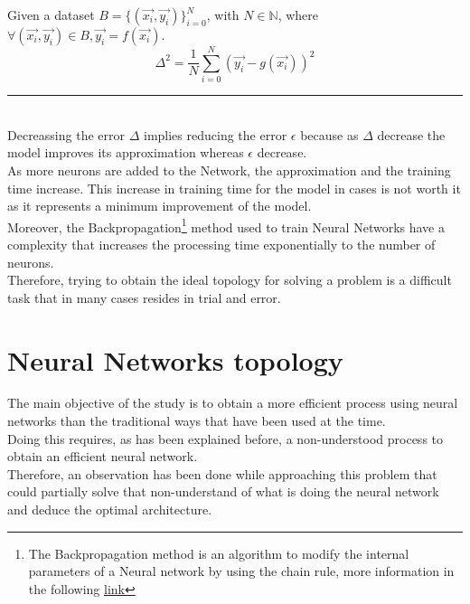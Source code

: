 \documentclass[a4paper, 11pt]{article}
\begin{document}
Given a dataset $B = \{(\vec{x_i},\vec{y_i})\}_{i=0}^{N}$, with $N \in \mathbb{N}$, where $\forall (\vec{x_i},\vec{y_i}) \in B, \vec{y_i} = f(\vec{x_i})$.
$$\Delta^2 = \frac{1}{N} \sum_{i=0}^{N} \left( \vec{y_i} - g(\vec{x_i}) \right)^2$$
\rule{\linewidth}{0.4pt}\\\vspace{0.5em}
Decreassing the error $\Delta$ implies reducing the error $\epsilon$ because as $\Delta$ decrease the model improves its approximation whereas $\epsilon$ decrease.\\
As more neurons are added to the Network, the approximation and the training time increase. This increase in training time for the model in cases is not worth it as it represents a minimum improvement of the model.\\
Moreover, the Backpropagation\footnote{The Backpropagation method is an algorithm to modify the internal parameters of a Neural network by using the chain rule, more information in the following \href{https://en.wikipedia.org/wiki/Backpropagation}{link}} method used to train Neural Networks have a complexity that increases the processing time exponentially to the number of neurons.\\
Therefore, trying to obtain the ideal topology for solving a problem is a difficult task that in many cases resides in trial and error.

\section{Neural Networks topology}
The main objective of the study is to obtain a more efficient process using neural networks than the traditional ways that have been used at the time.\\
Doing this requires, as has been explained before, a non-understood process to obtain an efficient neural network.\\
Therefore, an observation has been done while approaching this problem that could partially solve that non-understand of what is doing the neural network and deduce the optimal architecture. 
\end{document}
